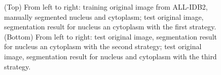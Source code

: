 \documentclass[final,a4paper,12pt,english]{UnicaPhdThesis3}
\begin{document}
	\begin{figure}[!htbp]
		\centering
		\caption{\label{fig:exs} (Top) From left to right: training original image from ALL-IDB2, manually segmented nucleus and cytoplasm; test original image, segmentation result for nucleus an cytoplasm with the first strategy. (Bottom) From left to right: test original image, segmentation result for nucleus an cytoplasm with the second strategy; test original image, segmentation result for nucleus and cytoplasm with the third strategy.}
	\end{figure}	
	
\end{document}
